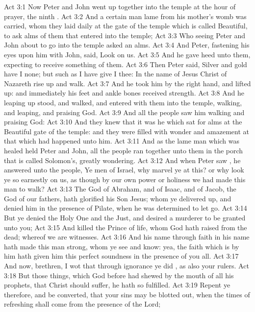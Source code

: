 \vs Act 3:1 Now Peter and John went up together into the temple at the hour of prayer,  the ninth .
\vs Act 3:2 And a certain man lame from his mother's womb was carried, whom they laid daily at the gate of the temple which is called Beautiful, to ask alms of them that entered into the temple;
\vs Act 3:3 Who seeing Peter and John about to go into the temple asked an alms.
\vs Act 3:4 And Peter, fastening his eyes upon him with John, said, Look on us.
\vs Act 3:5 And he gave heed unto them, expecting to receive something of them.
\vs Act 3:6 Then Peter said, Silver and gold have I none; but such as I have give I thee: In the name of Jesus Christ of Nazareth rise up and walk.
\vs Act 3:7 And he took him by the right hand, and lifted  up: and immediately his feet and ankle bones received strength.
\vs Act 3:8 And he leaping up stood, and walked, and entered with them into the temple, walking, and leaping, and praising God.
\vs Act 3:9 And all the people saw him walking and praising God:
\vs Act 3:10 And they knew that it was he which sat for alms at the Beautiful gate of the temple: and they were filled with wonder and amazement at that which had happened unto him.
\vs Act 3:11 And as the lame man which was healed held Peter and John, all the people ran together unto them in the porch that is called Solomon's, greatly wondering.
\vs Act 3:12 And when Peter saw , he answered unto the people, Ye men of Israel, why marvel ye at this? or why look ye so earnestly on us, as though by our own power or holiness we had made this man to walk?
\vs Act 3:13 The God of Abraham, and of Isaac, and of Jacob, the God of our fathers, hath glorified his Son Jesus; whom ye delivered up, and denied him in the presence of Pilate, when he was determined to let  go.
\vs Act 3:14 But ye denied the Holy One and the Just, and desired a murderer to be granted unto you;
\vs Act 3:15 And killed the Prince of life, whom God hath raised from the dead; whereof we are witnesses.
\vs Act 3:16 And his name through faith in his name hath made this man strong, whom ye see and know: yea, the faith which is by him hath given him this perfect soundness in the presence of you all.
\vs Act 3:17 And now, brethren, I wot that through ignorance ye did , as  also your rulers.
\vs Act 3:18 But those things, which God before had shewed by the mouth of all his prophets, that Christ should suffer, he hath so fulfilled.
\vs Act 3:19 Repent ye therefore, and be converted, that your sins may be blotted out, when the times of refreshing shall come from the presence of the Lord;
